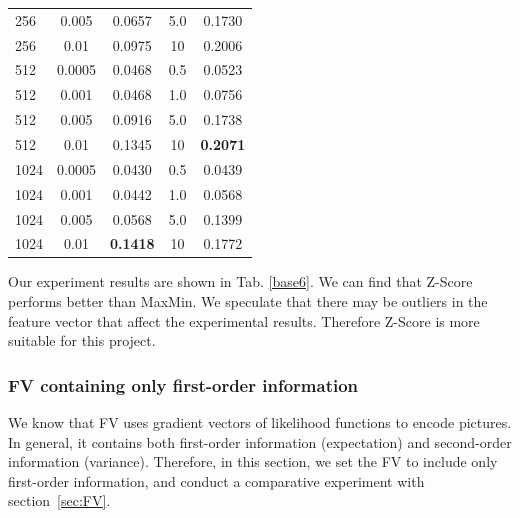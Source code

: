 \documentclass[conference]{IEEEtran}
\begin{document}
\begin{table}[htbp]
\begin{tabular}{@{}p{1cm}<{\centering}|c|c|c|c}
		256   & 0.005  & 0.0657 & 5.0 & 0.1730\\
        256   & 0.01  & 0.0975 & 10 & 0.2006\\
        \hline
		512   & 0.0005  & 0.0468 & 0.5 & 0.0523\\
		512   & 0.001  & 0.0468 & 1.0 & 0.0756\\
		512   & 0.005  & 0.0916 & 5.0 & 0.1738\\
        512   & 0.01  & 0.1345 & 10 & \textbf{0.2071}\\
        \hline
		1024   & 0.0005  & 0.0430 & 0.5 & 0.0439\\
		1024   & 0.001  & 0.0442 & 1.0 & 0.0568\\
		1024   & 0.005  & 0.0568 & 5.0 & 0.1399\\
		1024   & 0.01  & \textbf{0.1418} & 10 & 0.1772\\
		\hline
	\end{tabular}
\end{table}

Our experiment results are shown in Tab. \ref{base6}. We can find that Z-Score performs better than MaxMin.
We speculate that there may be outliers in the feature vector that affect the experimental results. Therefore Z-Score is more suitable for this project.
\subsubsection{FV containing only first-order information}
We know that FV uses gradient vectors of likelihood functions to encode pictures. In general, it contains both first-order information (expectation) and second-order information (variance). Therefore, in this section, we set the FV to include only first-order information, and conduct a comparative experiment with section~\ref{sec:FV}.
\end{document}
